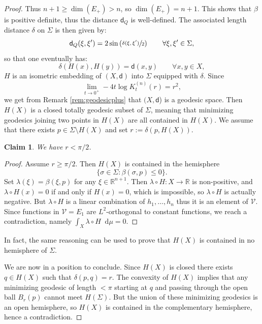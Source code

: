\documentclass[JEP,XML,SOM,Unicode,published]{cedram}
\let\backslash\setminus
\theoremstyle{plain}
\newtheorem{claim}[theorem]{Claim}
\theoremstyle{definition}
\newcommand{\setR}{\mathbb{R}}
\newcommand{\cV}{\mathcal{V}}
\newcommand{\di}{\mathop{}\!\mathrm{d}}
\newcommand{\dist}{\mathsf{d}}
\begin{document}
\begin{proof}
Thus $n+1 \ge \dim(E_+)> n$, so $\dim(E_+)=n+1$. This shows that $\beta$ is positive definite, thus the distance $\dist_Q$ is well-defined. The associated length distance $\delta$ on $\Sigma$ is then given by:
\[
\dist_Q(\xi,\xi') = 2 \sin\left(\sfrac{\delta(\xi,\xi')}{2} \right) \qquad \forall \xi, \xi' \in \Sigma,
\]
so that one eventually has:
\[
\delta(H(x),H(y)) = \dist(x,y) \qquad \forall x,y \in X,
\]
\ie $H$ is an isometric embedding of $(X,\dist)$ into $\Sigma$ equipped with $\delta$.
Since
\[
\lim_{t\to 0^+} -4t \log K_t^{(n)}(r)=r^2,
\]
we get from Remark \ref{rem:geodesicplus} that
$(X,\dist$) is a geodesic space. Then $H(X)$ is a closed totally geodesic subset of $\Sigma$, meaning that minimizing geodesics joining two points in $H(X)$ are all contained in $H(X)$. We assume that there exists $p \in \Sigma \backslash H(X)$ and set $r:=\delta(p,H(X))$.

\begin{claim}
We have $r< \pi/2$.
\end{claim}

\begin{proof}
Assume $r\ge \pi/2$. Then $H(X)$ is contained in the hemisphere
\[
\{\sigma \in \Sigma: \beta(\sigma,p)\le 0\}.
\]
Set $\lambda(\xi)=\beta(\xi,p)$ for any $\xi \in \setR^{n+1}$. Then $\lambda \circ H:X\to\setR$ is non-positive, and $\lambda \circ H(x)=0$ if and only if $H(x)=0$, which is impossible, so $\lambda \circ H$ is actually negative. But $\lambda \circ H$ is a linear combination of $h_1,\ldots,h_n$ thus it is an element of $\cV$. Since functions in $\cV = E_1$ are $L^2$-orthogonal to constant functions, we reach a contradiction, namely $\int_X \lambda \circ H \di \mu = 0$.
\end{proof}

In fact, the same reasoning can be used to prove that $H(X)$ is contained in no hemisphere of $\Sigma$.

We are now in a position to conclude. Since $H(X)$ is closed there exists $q\in H(X)$ such that $\delta(p,q)=r$. The convexity of $H(X)$ implies that any minimizing geodesic of length $<\pi$ starting at $q$ and passing through the open ball $B_r(p)$ cannot meet $H(\Sigma)$. But the union of these minimizing geodesics is an open hemisphere, so $H(X)$ is contained in the complementary hemisphere, hence a contradiction.
\end{proof}

\backmatter


\end{document}
